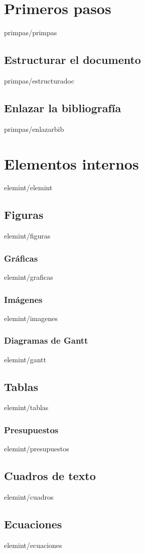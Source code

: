 \documentclass[epsbased,copyright,final,printable,covers,extendedindex,firstnumbered,tfg,gnuplot]{tfgtfmthesisuam}
\begin{document}
\chapter{Primeros pasos\label{CAP:PRIMEROSPASOS}}{primpas/primpas}
  \section{Estructurar el documento\label{SEC:ESTRUCTURAR}}{primpas/estructuradoc}
  \section{Enlazar la bibliografía\label{SEC:ENLAZBIBLIOGRAFIA}}{primpas/enlazarbib}

\chapter{Elementos internos\label{CAP:ELEMINT}}{elemint/elemint}
  \section{Figuras\label{SEC:FIGURAS}}{elemint/figuras}
    \subsection{Gráficas\label{SS:GRAFICAS}}{elemint/graficas}
    \subsection{Imágenes\label{SS:INMAGENES}}{elemint/imagenes}
    \subsection{Diagramas de Gantt\label{SS:GANTT}}{elemint/gantt}
  \section{Tablas\label{SEC:TABLAS}}{elemint/tablas}
    \subsection{Presupuestos\label{SS:PRESUPUESTOS}}{elemint/presupuestos}
  \section{Cuadros de texto\label{SEC:CUADROS}}{elemint/cuadros}
  \section{Ecuaciones\label{SEC:ECUACIONES}}{elemint/ecuaciones}
\end{document}

